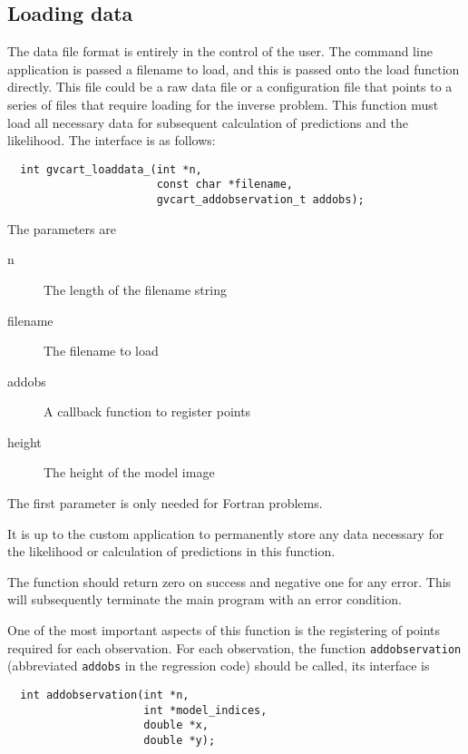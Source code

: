 \documentclass[a4paper,12pt]{article}
\begin{document}
\subsection{Loading data}

The data file format is entirely in the control of the user. 
The command line application is passed a filename to load, and this is
passed onto the load function directly. This file could be a raw data
file or a configuration file that points to a series of files that
require loading for the inverse problem. This function must load all
necessary data for subsequent calculation of predictions and the
likelihood. The interface is as follows:

\begin{verbatim}
  int gvcart_loaddata_(int *n,
                       const char *filename,
                       gvcart_addobservation_t addobs);
\end{verbatim}

The parameters are

\begin{description}
\item[n] The length of the filename string
\item[filename] The filename to load
\item[addobs] A callback function to register points
\item[height] The height of the model image
\end{description}

The first parameter is only needed for Fortran problems. 

It is up to the custom application to permanently store any data
necessary for the likelihood or calculation of predictions in this
function.

The function should return zero on success and negative one for any
error. This will subsequently terminate the main program with an
error condition.

One of the most important aspects of this function is the registering
of points required for each observation. For each observation,
the function \texttt{addobservation} (abbreviated \texttt{addobs} in the
regression code) should be called, its interface is

\begin{verbatim}
  int addobservation(int *n,
                     int *model_indices,
                     double *x,
                     double *y);
\end{verbatim}
\end{document}
